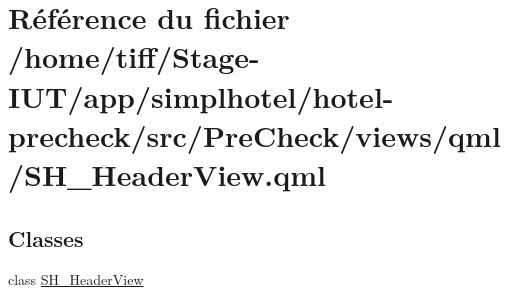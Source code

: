 \hypertarget{SH__HeaderView_8qml}{\section{Référence du fichier /home/tiff/\-Stage-\/\-I\-U\-T/app/simplhotel/hotel-\/precheck/src/\-Pre\-Check/views/qml/\-S\-H\-\_\-\-Header\-View.qml}
\label{SH__HeaderView_8qml}
}
\subsection*{Classes}
\begin{DoxyCompactItemize}
\item 
class \hyperlink{classSH__HeaderView}{S\-H\-\_\-\-Header\-View}
\end{DoxyCompactItemize}
